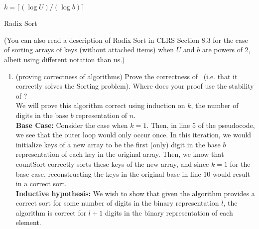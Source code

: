 \documentclass[11pt]{article}
\begin{document}
\begin{enumerate}
\begin{algorithm}[H]
\\
$k=\lceil (\log U)/(\log b)\rceil$\;
\caption{Radix Sort}
\end{algorithm}

(You can also read a description of Radix Sort in CLRS Section 8.3 for the case of sorting arrays of keys (without attached items) when $U$ and $b$ are powers of 2, albeit using different notation than us.)

        \begin{enumerate}
        
            \item (proving correctness of algorithms) Prove the correctness of \RadixSort\ (i.e. that it correctly solves the Sorting problem).  Where does your proof use the stability of \CountingSort? \\
            
            We will prove this algorithm correct using induction on $k$, the number of digits in the base $b$ representation of $n$. \\
            
            \textbf{Base Case: } Consider the case when $k=1$. Then, in line $5$ of the pseudocode, we see that the outer loop would only occur once. In this iteration, we would initialize keys of a new array to be the first (only) digit in the base $b$ representation of each key in the original array. Then, we know that countSort correctly sorts these keys of the new array, and since $k=1$ for the base case, reconstructing the keys in the original base in line $10$ would result in a correct sort. \\
            
            \textbf{Inductive hypothesis: } We wish to show that given the algorithm provides a correct sort for some number of digits in the binary representation $l$, the algorithm is correct for $l+1$ digits in the binary representation of each element. 
            

\end{enumerate}
\end{enumerate}
\end{document}
